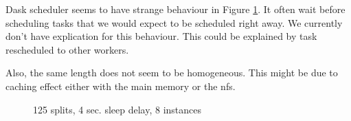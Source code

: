 \documentclass[11pt,a4paper]{article}
\begin{document}
Dask scheduler seems to have strange behaviour in Figure \ref{fig:inc_gantt}. It
often wait before scheduling tasks that we would expect to be scheduled right away.
We currently don't have explication for this behaviour. This could be explained by
task rescheduled to other workers.

Also, the same length does not seem to be homogeneous. This might be due to caching
effect either with the main memory or the nfs.

\begin{figure}[htp]
    \centering
    
    \caption{125 splits, 4 sec. sleep delay, 8 instances}
    \label{fig:inc_gantt}
\end{figure}
\end{document}
